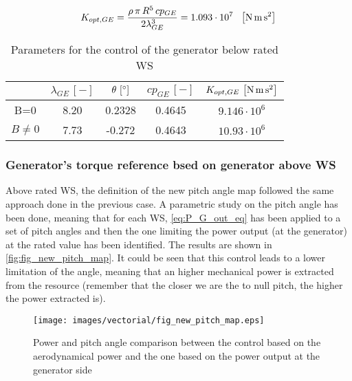 \begin{equation}
  K_{opt,GE} = \frac{\rho \, \pi \, R^5 \, cp_{GE}}{2\lambda_{GE}^3} = 1.093\cdot10^7 \ \ \mesunt{\newton\meter\square\second}
  \label{eq:K_opt_GE}
\end{equation}

\begin{table}[htb]
  \centering
  \caption{Parameters for the control of the generator below rated WS}
  \begin{tabular}{ccccc}
    \toprule
    & $\lambda_{GE} \, \left[-\right]$ & $\theta \, \left[\si{\degree}\right]$ & $cp_{GE} \, \left[-\right]$ & $K_{opt,GE} \, \left[\si{\newton\meter\square\second}\right]$ \\ \midrule
    B=0 & 8.20 & 0.2328 & 0.4645 & $9.146 \cdot 10^6$\\
    $B\ne0$ & 7.73 & -0.272 & 0.4643 & $10.93 \cdot 10^6$\\ \bottomrule
  \end{tabular}
  \label{tab:tab_k_opt_GE}
\end{table}

\subsubsection[Above rated WS]{Generator's torque reference bsed on generator above WS}
Above rated WS, the definition of the new pitch angle map followed the same approach done in the previous case. A parametric study on the pitch angle has been done, meaning that for each WS, \autoref{eq:P_G_out_eq} has been applied to a set of pitch angles and then the one limiting the power output (at the generator) at the rated value has been identified. The results are shown in \autoref{fig:fig_new_pitch_map}. It could be seen that this control leads to a lower limitation of the angle, meaning that an higher mechanical power is extracted from the resource (remember that the closer we are the to null pitch, the higher the power extracted is).
\begin{figure}[htb]
  \centering
  \texttt{[image: images/vectorial/fig\_new\_pitch\_map.eps]}
  \caption{Power and pitch angle comparison between the control based on the aerodynamical power and the one based on the power output at the generator side}
  \label{fig:fig_new_pitch_map}
\end{figure}

